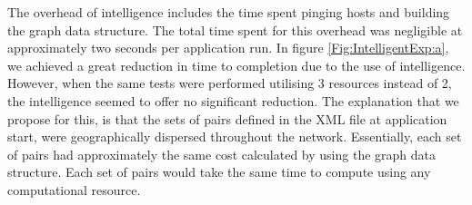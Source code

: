\documentclass{rspublic}
\newcommand{\micnote}[1]{ {\textcolor{blue} { ***Michael: #1 }}}
\newcommand{\betynote}[1]{ {\textcolor{orange} { ***Bety: #1 }}}
\newcommand{\jhanote}[1]{} \newcommand{\micnote}[1]{}\newcommand{\betynote}[1]{} \newcommand{\fixme}[1]{}
\begin{document}
The overhead of intelligence includes the time spent pinging hosts and
building the graph data structure. The total time spent for this
overhead was negligible at approximately two seconds per application
run. In figure \ref{Fig:IntelligentExp:a}, we achieved a great reduction
in time to completion due to the use of intelligence.  However, when the
same tests were performed utilising 3 resources instead of 2, the
intelligence seemed to offer no significant reduction. The explanation
that we propose for this, is that the sets of pairs defined in the XML
file at application start, were geographically dispersed throughout the
network.  Essentially, each set of pairs had approximately the same cost
calculated by using the graph data structure. Each set of pairs would
take the same time to compute using any computational resource.
\jhanote{Perhaps define a test to verify this, so a note can go in
saying we investigated this}
\end{document}
